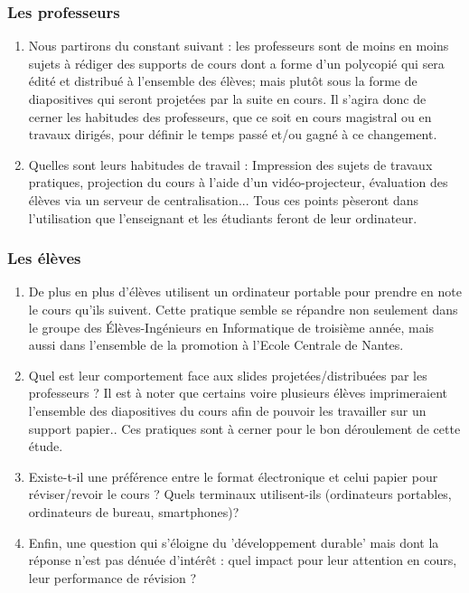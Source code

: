 \documentclass[a4paper,11pt,french]{article}
\begin{document}
\subsubsection{Les professeurs}
\begin{enumerate}
\item Nous partirons du constant suivant : les professeurs sont de moins en moins sujets à rédiger des supports de cours dont a forme d'un polycopié qui sera édité et distribué à l'ensemble des élèves; mais plutôt sous la forme de diapositives qui seront projetées par la suite en cours. Il s'agira donc de cerner les habitudes des professeurs, que ce soit en cours magistral ou en travaux dirigés, pour définir le temps passé et/ou gagné à ce changement.
\item Quelles sont leurs habitudes de travail : Impression des sujets de travaux pratiques, projection du cours à l'aide d'un vidéo-projecteur, évaluation des élèves via un serveur de centralisation... Tous ces points pèseront dans l'utilisation que l'enseignant et les étudiants feront de leur ordinateur.
\end{enumerate}


\subsubsection{Les élèves}
\begin{enumerate}
\item De plus en plus d'élèves utilisent un ordinateur portable pour prendre en note le cours qu'ils suivent. Cette pratique semble se répandre non seulement dans le groupe des Élèves-Ingénieurs en Informatique de troisième année, mais aussi dans l'ensemble de la promotion à l'Ecole Centrale de Nantes.
\item Quel est leur comportement face aux slides projetées/distribuées par les professeurs ? Il est à noter que certains voire plusieurs élèves imprimeraient l'ensemble des diapositives du cours afin de pouvoir les travailler sur un support papier.. Ces pratiques sont à cerner pour le bon déroulement de cette étude.
\item Existe-t-il une préférence entre le format électronique et celui papier pour réviser/revoir le cours ? Quels terminaux utilisent-ils (ordinateurs portables, ordinateurs de bureau, smartphones)?
\item Enfin, une question qui s'éloigne du 'développement durable' mais dont la réponse n'est pas dénuée d'intérêt : quel impact pour leur attention en cours, leur performance de révision ?
\end{enumerate}
\end{document}
